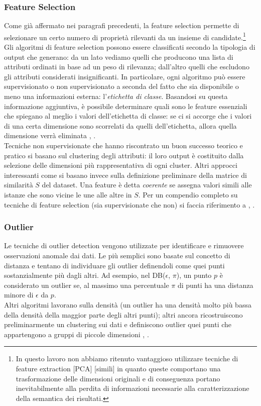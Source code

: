 \subsubsection{Feature Selection}
Come gi\`a affermato nei paragrafi precedenti, la feature selection permette di selezionare un certo numero di propriet\`a rilevanti da un insieme di candidate.\footnote{In questo lavoro non abbiamo ritenuto vantaggioso utilizzare tecniche di feature extraction [PCA] [simili] in quanto queste comportano una trasformazione delle dimensioni originali e di conseguenza portano inevitabilmente alla perdita di informazioni necessarie alla caratterizzazione della semantica dei risultati.}
Gli algoritmi di feature selection possono essere classificati secondo la tipologia di output che generano: da un lato vediamo quelli che producono una lista di attributi ordinati in base ad un peso di rilevanza; dall'altro quelli che escludono gli attributi considerati insignificanti. In particolare, ogni algoritmo pu\`o essere supervisionato o non supervisionato a seconda del fatto che sia disponibile o meno una informazioni esterna: l'\textit{etichetta di classe}. Basandosi su questa informazione aggiuntiva, \`e possibile determinare quali sono le feature essenziali che spiegano al meglio i valori dell'etichetta di classe: se ci si accorge che i valori di una certa dimensione sono scorrelati da quelli dell'etichetta, allora quella dimensione verr\`a eliminata \cite{hall1999}, \cite{Molina2002}.\\
Tecniche non supervisionate che hanno riscontrato un buon successo teorico e pratico si basano sul clustering degli attributi: il loro output \`e costituito dalla selezione delle dimensioni pi\`u rappresentativa di ogni cluster. Altri approcci interessanti come \cite{Zhao2007} si basano invece sulla definizione preliminare della matrice di similarit\`a $ S $ del dataset. Una feature \`e detta \textit{coerente} se assegna valori simili alle istanze che sono vicine le une alle altre in  $ S $.
Per un compendio completo su tecniche di feature selection (sia supervisionate che non) si faccia riferimento a \cite{Molina2002}, \cite{Chandrashekar2014}.

\subsubsection{Outlier}

Le tecniche di outlier detection vengono utilizzate per identificare e rimuovere osservazioni anomale dai dati.
Le pi\`u semplici sono basate sul concetto di distanza e tentano di individuare gli outlier definendoli come quei punti sostanzialmente pi\`u  dagli altri. Ad esempio, nel DB($\epsilon$, $\pi$), \cite{Knorr97} un punto $ p $ \`e considerato un outlier se, al massimo una percentuale $ \pi $ di punti ha una distanza minore di $\epsilon $ da $ p $.\\
Altri algoritmi lavorano sulla densit\`a \cite{Breunig2000,Breunig1999} (un outlier ha una densit\`a  molto pi\`u bassa della densit\`a della maggior parte degli altri punti); altri ancora ricostruiscono preliminarmente un clustering sui dati e definiscono outlier quei punti che appartengono a gruppi di piccole dimensioni \cite{Hodge2004}, \cite{Chandola07}.

